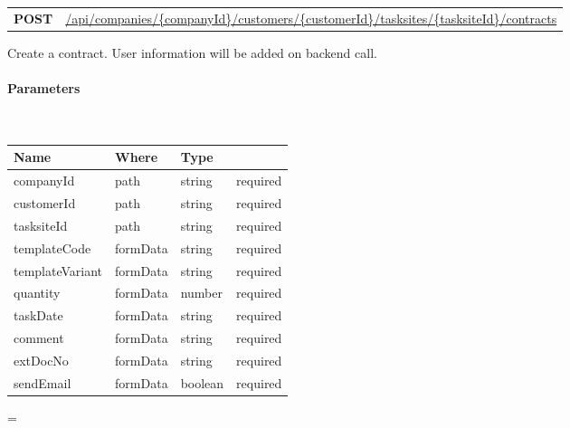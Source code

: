 \documentclass[10pt]{article}
\newcommand{\method}[2]{
    \begin{mdframed}[style=#1]
        \color{white}
        \begin{tabularx}{\textwidth}{lX}
            \MakeUppercase{\textbf{#1}} & #2 \\
        \end{tabularx}
    \end{mdframed}
}
\newenvironment{absolutelynopagebreak}
  {\par\nobreak\vfil\penalty0\vfilneg
   \vtop\bgroup}
  {\par\xdef\tpd{\the\prevdepth}\egroup
   \prevdepth=\tpd}
\begin{document}
            \vspace{.5cm}
            \begin{absolutelynopagebreak}
                \label{route:bd0d31470fd6d2e5bbbb393550612adf}
                \method{post}{\url{/api/companies/{companyId}/customers/{customerId}/tasksites/{tasksiteId}/contracts}}

                \begin{flushleft}
                    Create a contract. User information will be added on backend call.
                    \vspace{.25cm}

                    \paragraph{Parameters}\mbox{}\\
                    \vspace{.25cm}
                    \begin{tabularx}{\textwidth}{lXlr}
                        \textbf{Name} & \textbf{Where} & \textbf{Type} \\
                        \hline
                            companyId & path & string & required \\
                            customerId & path & string & required \\
                            tasksiteId & path & string & required \\
                            templateCode & formData & string & required \\
                            templateVariant & formData & string & required \\
                            quantity & formData & number & required \\
                            taskDate & formData & string & required \\
                            comment & formData & string & required \\
                            extDocNo & formData & string & required \\
                            sendEmail & formData & boolean & required \\
                    \end{tabularx}


\end{flushleft}
\end{absolutelynopagebreak}
\end{document}
